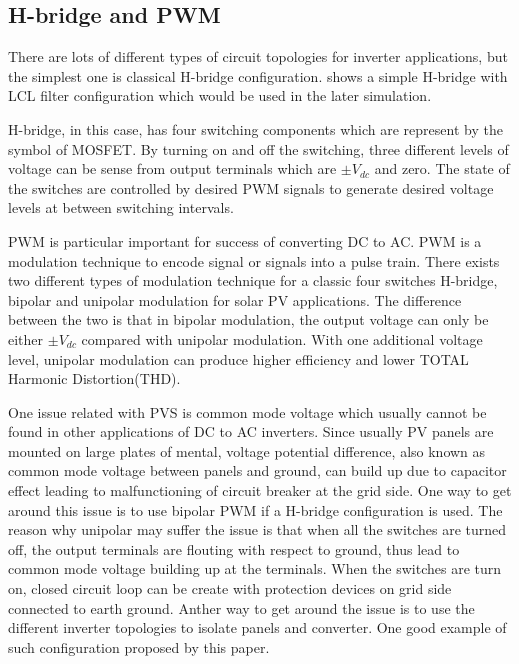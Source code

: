 \subsection{H-bridge and PWM}

There are lots of different types of circuit topologies for inverter applications\cite{7392067}\cite{7356292}, but the simplest one is classical H-bridge configuration.  shows a simple H-bridge with LCL filter configuration which would be used in the later simulation.

H-bridge, in this case, has four switching components which are represent by the symbol of MOSFET. By turning on and off the switching, three different levels of voltage can be sense from output terminals which are $\pm V_{dc}$ and zero. The state of the switches are controlled by desired \gls{PWM} signals to generate desired voltage levels at between switching intervals.

\gls{PWM} is particular important for success of converting \gls{DC} to \gls{AC}. \gls{PWM} is a modulation technique to encode signal or signals into a pulse train. There exists two different types of modulation technique for a classic four switches H-bridge, bipolar and unipolar modulation for solar \gls{PV} applications. The difference between the two is that in bipolar modulation, the output voltage can only be either $\pm V_{dc}$ compared with unipolar modulation. With one additional voltage level, unipolar modulation can produce higher efficiency and lower TOTAL Harmonic Distortion(THD). 

One issue related with \gls{PVS} is common mode voltage which usually cannot be found in other applications of \gls{DC} to \gls{AC} inverters. Since usually \gls{PV} panels are mounted on large plates of mental, voltage potential difference, also known as common mode voltage between panels and ground,  can build up due to capacitor effect leading to malfunctioning of circuit breaker at the grid side. One way to get around this issue is to use bipolar \gls{PWM} if a H-bridge configuration is used. The reason why unipolar may suffer the issue is that when all the switches are turned off, the output terminals are flouting with respect to ground, thus lead to common mode voltage building up at the terminals. When the switches are turn on, closed circuit loop can be create with protection devices on grid side connected to earth ground. Anther way to get around the issue is to use the different inverter topologies to isolate panels and converter. One good example of such configuration proposed by this paper\cite{7356292}.

